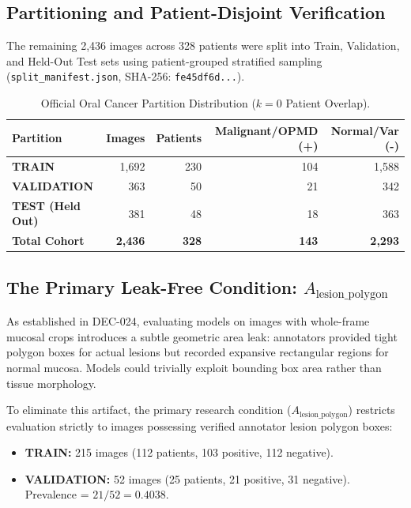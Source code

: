 \documentclass[11pt,a4paper]{report}
\newcommand{\artifact}[1]{\texttt{\footnotesize #1}}
\begin{document}
\subsection{Partitioning and Patient-Disjoint Verification}
The remaining 2,436 images across 328 patients were split into Train, Validation, and Held-Out Test sets using patient-grouped stratified sampling (\artifact{split\_manifest.json}, SHA-256: \texttt{fe45df6d...}).
\begin{table}[H]
\centering
\small
\begin{tabular}{lrrrr}
\toprule
\textbf{Partition} & \textbf{Images} & \textbf{Patients} & \textbf{Malignant/OPMD (+)} & \textbf{Normal/Var (-)} \\
\midrule
\textbf{TRAIN} & 1,692 & 230 & 104 & 1,588 \\
\textbf{VALIDATION} & 363 & 50 & 21 & 342 \\
\textbf{TEST (Held Out)} & 381 & 48 & 18 & 363 \\
\midrule
\textbf{Total Cohort} & \textbf{2,436} & \textbf{328} & \textbf{143} & \textbf{2,293} \\
\bottomrule
\end{tabular}
\caption{Official Oral Cancer Partition Distribution ($k=0$ Patient Overlap).}
\label{tab:oral_partitions}
\end{table}

\subsection{The Primary Leak-Free Condition: $A_\text{lesion\_polygon}$}
As established in DEC-024, evaluating models on images with whole-frame mucosal crops introduces a subtle geometric area leak: annotators provided tight polygon boxes for actual lesions but recorded expansive rectangular regions for normal mucosa. Models could trivially exploit bounding box area rather than tissue morphology. 

To eliminate this artifact, the primary research condition ($A_\text{lesion\_polygon}$) restricts evaluation strictly to images possessing verified annotator lesion polygon boxes:
\begin{itemize}
  \item \textbf{TRAIN:} 215 images (112 patients, 103 positive, 112 negative).
  \item \textbf{VALIDATION:} 52 images (25 patients, 21 positive, 31 negative). Prevalence = $21/52 = 0.4038$.
\end{itemize}
\end{document}
